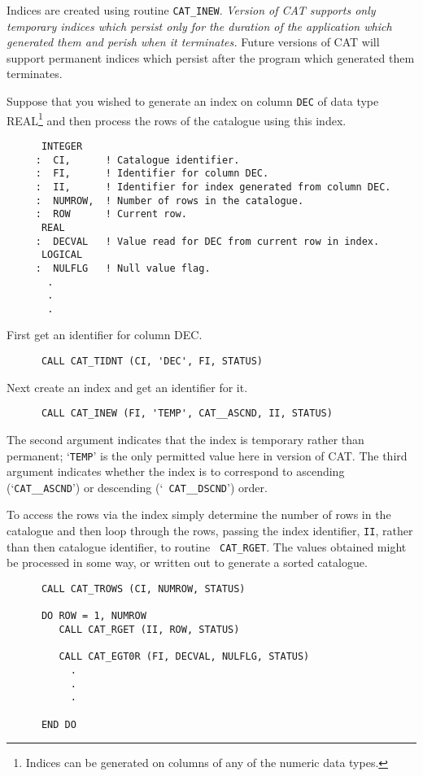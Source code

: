 Indices are created using routine {\tt CAT\_INEW}. {\it Version 
\CATversion of CAT supports only temporary indices which persist only
for the duration of the application which generated them and perish
when it terminates.} Future versions of CAT will support permanent
indices which persist after the program which generated them terminates.

Suppose that you wished to generate an index on column {\tt DEC} of data 
type REAL\footnote{Indices can be generated on columns of any of the
numeric data types.} and then process the rows of the catalogue
using this index.

\begin{verbatim}
      INTEGER
     :  CI,      ! Catalogue identifier.
     :  FI,      ! Identifier for column DEC.
     :  II,      ! Identifier for index generated from column DEC.
     :  NUMROW,  ! Number of rows in the catalogue.
     :  ROW      ! Current row.
      REAL
     :  DECVAL   ! Value read for DEC from current row in index.
      LOGICAL
     :  NULFLG   ! Null value flag.
       .
       .
       .
\end{verbatim}

First get an identifier for column DEC.

\begin{verbatim}
      CALL CAT_TIDNT (CI, 'DEC', FI, STATUS)
\end{verbatim}

Next create an index and get an identifier for it.

\begin{verbatim}
      CALL CAT_INEW (FI, 'TEMP', CAT__ASCND, II, STATUS)
\end{verbatim}

The second argument indicates that the index is temporary rather than
permanent; `{\tt TEMP}' is the only permitted value here in version
\CATversion of CAT. The third argument indicates whether the index is to
correspond to ascending (`{\tt CAT\_\_ASCND}') or descending (`{\tt 
CAT\_\_DSCND}') order.

To access the rows via the index simply determine the number of rows in 
the catalogue and then loop through the rows, passing the index identifier,
{\tt II}, rather than then catalogue identifier, to routine {\tt 
CAT\_RGET}. The values obtained might be processed in some way, or
written out to generate a sorted catalogue.

\begin{verbatim}
      CALL CAT_TROWS (CI, NUMROW, STATUS)

      DO ROW = 1, NUMROW
         CALL CAT_RGET (II, ROW, STATUS)

         CALL CAT_EGT0R (FI, DECVAL, NULFLG, STATUS)
           .
           .
           .

      END DO
\end{verbatim}


